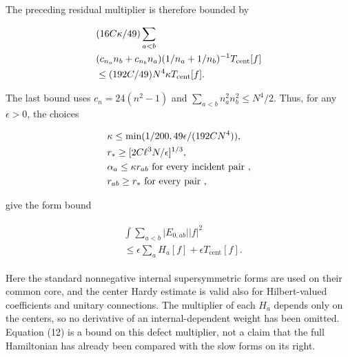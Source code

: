 The preceding residual multiplier is therefore bounded by

\begin{gather*}
\begin{aligned}
& (16C \kappa  /49) \sum _{a<b} \\
& (c_{n_{a}}n_{b}+c_{n_{b}}n_{a})(1/n_{a}+1/n_{b})^{-1} T_{\mathrm{cent}}[f] \\
& \le (192C/49)N^{4} \kappa  T_{\mathrm{cent}}[f].
\end{aligned}\notag
\end{gather*}

The last bound uses \(c_{n}=24(n^{2}-1)\) and
\(\sum _{a<b}n_{a}^{2}n_{b}^{2}\le N^{4}/2\). Thus, for any
\(\epsilon  >0\), the choices

\begin{gather*}
\begin{aligned}
& \kappa  \le \min (1/200, 49 \epsilon  /(192C N^{4})), \\
& r_{*}\ge [2C \ell ^{3} N/ \epsilon  ]^{1/3}, \\
& \alpha _{a}\le  \kappa  r_{ab} \text{ for every incident pair }, \\
& r_{ab}\ge r_{*} \text{ for every pair },
\end{aligned}\notag
\end{gather*}

give the form bound

\begin{gather*}
\begin{aligned}
& \int  \sum _{a<b}\vert E_{0,ab}\vert  \vert f\vert ^{2} \\
& \le  \epsilon  \sum _{a} H_{a}[f]+ \epsilon  T_{\mathrm{cent}}[f].
\end{aligned}\tag{12}
\end{gather*}

Here the standard nonnegative internal supersymmetric forms are used on
their common core, and the center Hardy estimate is valid also for
Hilbert-valued coefficients and unitary connections. The multiplier of
each \(H_{a}\) depends only on the centers, so no derivative of an
internal-dependent weight has been omitted. Equation (12) is a bound on
this defect multiplier, not a claim that the full Hamiltonian has
already been compared with the slow forms on its right.
